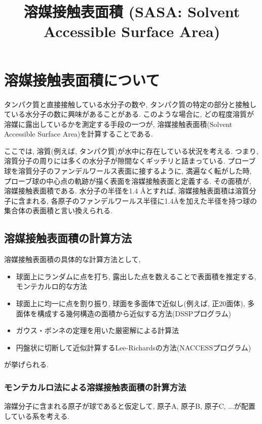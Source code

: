 





\title{溶媒接触表面積 (SASA: Solvent Accessible Surface Area)}
\maketitle

\section{溶媒接触表面積について\cite{2010TohHiroyuki}}
タンパク質と直接接触している水分子の数や, タンパク質の特定の部分と接触している水分子の数に興味があることがある. 
このような場合に, どの程度溶質が溶媒に露出しているかを測定する手段の一つが, 溶媒接触表面積(Solvent Accessible Surface Area)を計算することである. 

ここでは, 溶質(例えば, タンパク質)が水中に存在している状況を考える. つまり, 溶質分子の周りには多くの水分子が隙間なくギッチリと詰まっている. プローブ球を溶質分子のファンデルワールス表面に接するように, 満遍なく転がした時, プローブ球の中心点の軌跡が描く表面を溶媒接触表面と定義する. 
その面積が, 溶媒接触表面積である. 
水分子の半径を1.4 {\AA}とすれば, 溶媒接触表面積は溶質分子に含まれる, 各原子のファンデルワールス半径に1.4{\AA}を加えた半径を持つ球の集合体の表面積と言い換えられる. 


\subsection{溶媒接触表面積の計算方法}
溶媒接触表面積の具体的な計算方法として, 
\begin{itemize}
    \item 球面上にランダムに点を打ち, 露出した点を数えることで表面積を推定する, モンテカルロ的な方法
    \item 球面上に均一に点を割り振り, 球面を多面体で近似し(例えば, 正20面体), 多面体を構成する幾何構造の面積から近似する方法(DSSPプログラム)\cite{1983Kabsch}
    \item ガウス・ボンネの定理を用いた厳密解による計算法
    \item 円盤状に切断して近似計算するLee-Richardsの方法(NACCESSプログラム)\cite{1971Lee}
\end{itemize}

が挙げられる. 

\subsubsection{モンテカルロ法による溶媒接触表面積の計算方法}
溶媒分子に含まれる原子が球であると仮定して, 原子A, 原子B, 原子C, ...が配置している系を考える. 

